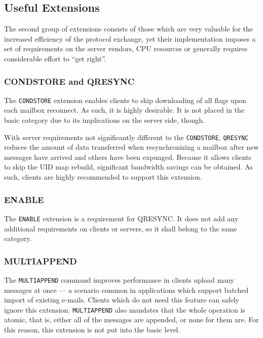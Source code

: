 \documentclass[trojita]{subfiles}
\begin{document}
\subsection{Useful Extensions}

The second group of extensions consists of those which are very valuable for the increased efficiency of the protocol
exchange, yet their implementation imposes a set of requirements on the server vendors, CPU resources or generally
requires considerable effort to ``get right''.

\subsubsection{CONDSTORE and QRESYNC}

The {\tt CONDSTORE} extension enables clients to skip downloading of all flags upon each mailbox reconnect.  As such, it
is highly desirable.  It is not placed in the basic category due to its implications on the server side, though.

With server requirements not significantly different to the {\tt CONDSTORE}, {\tt QRESYNC} reduces the amount of data
transferred when resynchronizing a mailbox after new messages have arrived and others have been expunged.  Because it
allows clients to skip the UID map rebuild, significant bandwidth savings can be obtained.  As such, clients are highly
recommended to support this extension.

\subsubsection{ENABLE}

The {\tt ENABLE} extension is a requirement for QRESYNC.  It does not add any additional requirements on clients or
servers, so it shall belong to the same category.

\subsubsection{MULTIAPPEND}

The {\tt MULTIAPPEND} command improves performance in clients upload many messages at once --- a scenario common in
applications which support batched import of existing e-mails.  Clients which do not need this feature can safely ignore
this extension.  {\tt MULTIAPPEND} also mandates that the whole operation is atomic, that is, either all of the messages
are appended, or none for them are.  For this reason, this extension is not put into the basic level.
\end{document}

